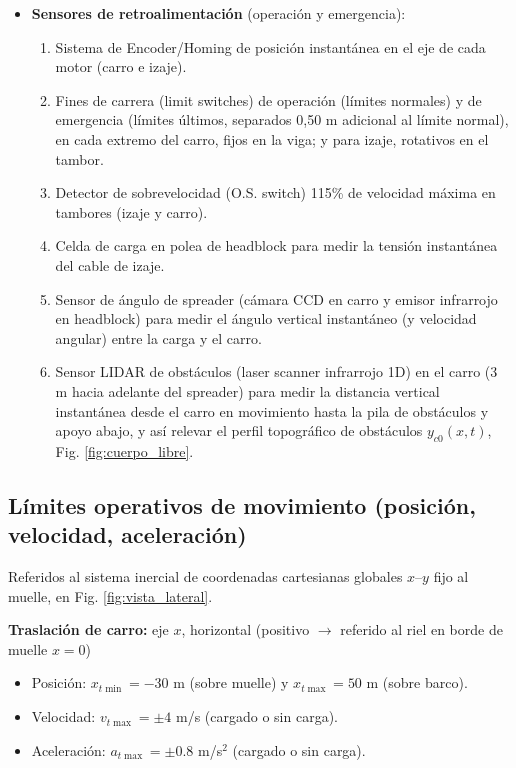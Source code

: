 \documentclass{article}
\begin{document}
\begin{itemize}
    \item \textbf{Sensores de retroalimentación} (operación y emergencia):
    \begin{enumerate}[label=\alph*.]
        \item Sistema de Encoder/Homing de posición instantánea en el eje de cada motor (carro e izaje).
        
        \item Fines de carrera (limit switches) de operación (límites normales) y de emergencia (límites últimos, separados 0,50 m adicional al límite normal), en cada extremo del carro, fijos en la viga; y para izaje, rotativos en el tambor.
        
        \item Detector de sobrevelocidad (O.S. switch) 115\% de velocidad máxima en tambores (izaje y carro).
        
        \item Celda de carga en polea de headblock para medir la tensión instantánea del cable de izaje.
        
        \item Sensor de ángulo de spreader (cámara CCD en carro y emisor infrarrojo en headblock) para medir el ángulo vertical instantáneo (y velocidad angular) entre la carga y el carro.
        
        \item Sensor LIDAR de obstáculos (laser scanner infrarrojo 1D) en el carro (3 m hacia adelante del spreader) para medir la distancia vertical instantánea desde el carro en movimiento hasta la pila de obstáculos y apoyo abajo, y así relevar el perfil topográfico de obstáculos $y_{c0}(x,t)$, Fig. \ref{fig:cuerpo_libre}.
    \end{enumerate}
\end{itemize}

\subsection{Límites operativos de movimiento (posición, velocidad, aceleración)}

Referidos al sistema inercial de coordenadas cartesianas globales $x$--$y$ fijo al muelle, en Fig. \ref{fig:vista_lateral}.

\noindent \textbf{Traslación de carro:} eje $x$, horizontal (positivo $\rightarrow$ referido al riel en borde de muelle $x = 0$)

\begin{itemize}
    \item Posición: $x_{t\min} = -30$ m (sobre muelle) y $x_{t\max} = 50$ m (sobre barco).
    
    \item Velocidad: $v_{t\max} = \pm 4$ m/s (cargado o sin carga).
    
    \item Aceleración: $a_{t\max} = \pm 0.8$ m/s$^2$ (cargado o sin carga).
\end{itemize}
\end{document}
